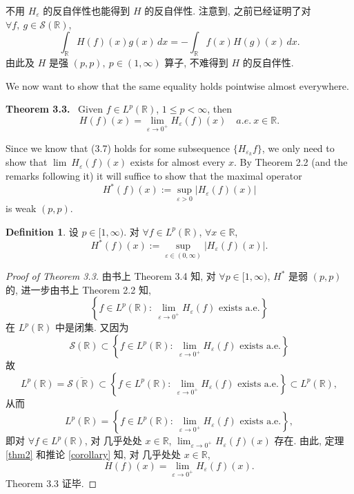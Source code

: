 \documentclass[a4paper,11pt]{article}
\theoremstyle{definition}
\newtheorem{definition}[theorem]{Definition}
\begin{document}
不用 $ H_\varepsilon $ 的反自伴性也能得到 $ H $ 的反自伴性. 
注意到, 之前已经证明了对 $ \forall f,\ g \in \mathcal{S}(\mathbb{R}) $,
$$
    \int_\mathbb{R} H (f)(x) g(x) \, dx
        = -\int_\mathbb{R} f(x) H (g)(x) \, dx.
$$
由此及 $ H $ 是强 $ (p, p), \ p \in (1, \infty) $ 算子, 不难得到 $ H $ 的反自伴性.

\begin{framed}
    We now want to show that the same equality holds pointwise almost everywhere.
    
    \vspace{0.2cm}
    \noindent\textbf{Theorem 3.3.} $ \, $ Given $ f \in L^p(\mathbb{R}) $, $ 1 \leq p < \infty $, then
    \begin{equation*}
        H (f) (x) = \lim_{\varepsilon \to 0^+} H_\varepsilon (f) (x) \quad a.e. \ x \in \mathbb{R}. \tag{3.7}
    \end{equation*}
    
    Since we know that (3.7) holds for some subsequence $ \{ H_{\varepsilon_k} f \} $, we only
    need to show that $ \lim \ H_\varepsilon (f) (x) $ exists for almost every $ x $. By Theorem 2.2 (and
    the remarks following it) it will suffice to show that the maximal operator
    $$
        H^* (f) (x) := \sup_{\varepsilon > 0} |H_\varepsilon (f) (x)|
    $$
    is weak $ (p, p) $. 
\end{framed}

\begin{definition}
    设 $ p \in [1, \infty) $. 对 $ \forall f \in L^p(\mathbb{R}) $, $ \forall x \in \mathbb{R} $,
    $$
        H^* (f) (x) := \sup_{\varepsilon \in (0, \infty)} |H_\varepsilon (f) (x)|.
    $$
\end{definition}

\begin{proof}[Proof of Theorem 3.3]
    由书上 Theorem 3.4 知, 对 $ \forall p \in [1, \infty) $, $ H^* $ 是弱 $ (p, p) $ 的, 进一步由书上 Theorem 2.2 知, 
    $$
        \left\{ f \in L^p(\mathbb{R}) :\ \lim_{\varepsilon \to 0^+} H_\varepsilon (f) \text{ exists a.e.} \right\}
    $$
    在 $ L^p(\mathbb{R}) $ 中是闭集. 又因为
    $$
        \mathcal{S}(\mathbb{R}) \subset
            \left\{ f \in L^p(\mathbb{R}) :\ \lim_{\varepsilon \to 0^+} H_\varepsilon (f) \text{ exists a.e.} \right\}
    $$
    故
    $$
        L^p(\mathbb{R}) = \overline{\mathcal{S}(\mathbb{R})} \subset
            \left\{ f \in L^p(\mathbb{R}) :\ \lim_{\varepsilon \to 0^+} H_\varepsilon (f) \text{ exists a.e.} \right\}
                \subset L^p(\mathbb{R}),
    $$
    从而
    $$
        L^p(\mathbb{R}) 
            = \left\{ f \in L^p(\mathbb{R}) :\ \lim_{\varepsilon \to 0^+} H_\varepsilon (f) \text{ exists a.e.} \right\},
    $$
    即对 $ \forall f \in L^p(\mathbb{R}) $, 对 几乎处处 $ x \in \mathbb{R} $, 
    $ \lim_{\varepsilon \to 0^+} H_\varepsilon (f) (x) $ 存在.
    由此, 定理 \ref{thm2}
    和推论 \ref{corollary} 知, 对 几乎处处 $ x \in \mathbb{R} $,
    $$
        H (f) (x) = \lim_{\varepsilon \to 0^+} H_\varepsilon (f) (x).
    $$
    Theorem 3.3 证毕.
\end{proof}
\end{document}
